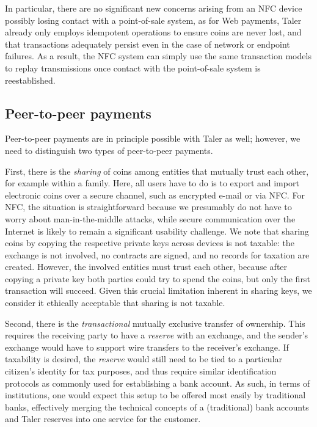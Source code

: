 \documentclass{llncs}
\begin{document}
In particular, there are no significant new concerns arising from an
NFC device possibly losing contact with a point-of-sale system, as for
Web payments, Taler already only employs idempotent operations to
ensure coins are never lost, and that transactions adequately persist
even in the case of network or endpoint failures.  As a result, the
NFC system can simply use the same transaction models to replay
transmissions once contact with the point-of-sale system is
reestablished.


\subsection{Peer-to-peer payments}

Peer-to-peer payments are in principle possible with Taler as well;
however, we need to distinguish two types of peer-to-peer payments.

First, there is the {\em sharing} of coins among entities that
mutually trust each other, for example within a family.  Here, all
users have to do is to export and import electronic coins over a
secure channel, such as encrypted e-mail or via NFC.  For NFC, the
situation is straightforward because we presumably do not have to worry
about man-in-the-middle attacks, while secure communication over the
Internet is likely to remain a significant usability challenge.  We
note that sharing coins by copying the respective private keys across
devices is not taxable: the exchange is not involved, no contracts are
signed, and no records for taxation are created.  However, the
involved entities must trust each other, because after copying a private
key both parties could try to spend the coins, but only the first
transaction will succeed.  Given this crucial limitation
inherent in sharing keys, we consider it ethically acceptable that
sharing is not taxable.

Second, there is the {\em transactional} mutually exclusive transfer
of ownership.  This requires the receiving party to have a {\em
  reserve} with an exchange, and the sender's exchange would have to
support wire transfers to the receiver's exchange.  If taxability is
desired, the {\em reserve} would still need to be tied to a particular
citizen's identity for tax purposes, and thus require similar
identification protocols as commonly used for establishing a bank
account.  As such, in terms of institutions, one would expect this
setup to be offered most easily by traditional banks, effectively
merging the technical concepts of a (traditional) bank accounts and
Taler reserves into one service for the customer.
\end{document}
